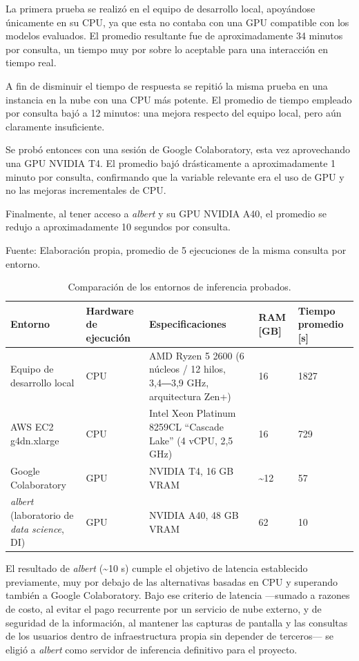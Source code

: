 La primera prueba se realizó en el equipo de desarrollo local, apoyándose únicamente en su CPU, ya que esta no contaba con una GPU compatible con los modelos evaluados. El promedio resultante fue de aproximadamente 34 minutos por consulta, un tiempo muy por sobre lo aceptable para una interacción en tiempo real.

A fin de disminuir el tiempo de respuesta se repitió la misma prueba en una instancia en la nube con una CPU más potente. El promedio de tiempo empleado por consulta bajó a 12 minutos: una mejora respecto del equipo local, pero aún claramente insuficiente.

Se probó entonces con una sesión de Google Colaboratory, esta vez aprovechando una GPU NVIDIA T4. El promedio bajó drásticamente a aproximadamente 1 minuto por consulta, confirmando que la variable relevante era el uso de GPU y no las mejoras incrementales de CPU.

Finalmente, al tener acceso a \textit{albert} y su GPU NVIDIA A40, el promedio se redujo a aproximadamente 10 segundos por consulta.

\begin{table}[h]
    \centering
    \caption{\label{table:entornosinferencia} Comparación de los entornos de inferencia probados.} Fuente: Elaboración propia, promedio de 5 ejecuciones de la misma consulta por entorno.
    \begin{tabular}{|p{2.6cm}|p{2.3cm}|p{4.8cm}|p{1.8cm}|p{2cm}|}
        \hline
        \textbf{Entorno} & \textbf{Hardware de ejecución} & \textbf{Especificaciones} & \textbf{RAM [GB]} & \textbf{Tiempo promedio [s]} \\
        \hline
        Equipo de desarrollo local & CPU & AMD Ryzen 5 2600 (6 núcleos / 12 hilos, 3,4―3,9 GHz, arquitectura Zen+) & 16 & 1827 \\
        \hline
        AWS EC2 g4dn.xlarge & CPU & Intel Xeon Platinum 8259CL ``Cascade Lake'' (4 vCPU, 2,5 GHz) & 16  & 729 \\
        \hline
        Google Colaboratory & GPU & NVIDIA T4, 16 GB VRAM & \textasciitilde{}12 & 57 \\
        \hline
        \textit{albert} (laboratorio de \textit{data science}, DI) & GPU & NVIDIA A40, 48 GB VRAM & 62 & 10 \\
        \hline
    \end{tabular}
\end{table}

El resultado de \textit{albert} (\textasciitilde{}10 s) cumple el objetivo de latencia establecido previamente, muy por debajo de las alternativas basadas en CPU y superando también a Google Colaboratory. Bajo ese criterio de latencia —sumado a razones de costo, al evitar el pago recurrente por un servicio de nube externo, y de seguridad de la información, al mantener las capturas de pantalla y las consultas de los usuarios dentro de infraestructura propia sin depender de terceros— se eligió a \textit{albert} como servidor de inferencia definitivo para el proyecto.

